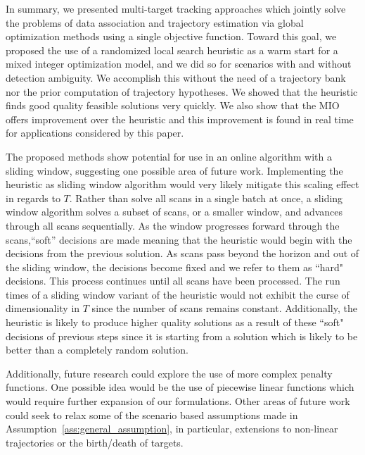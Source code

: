 In summary, we presented multi-target tracking approaches which jointly solve the problems of data association and trajectory estimation via global optimization methods using a single objective function. Toward this goal, we proposed the use of a randomized local search heuristic as a warm start for a mixed integer optimization model, and we did so for scenarios with and without detection ambiguity. We accomplish this without the need of a trajectory bank nor the prior computation of trajectory hypotheses. We showed that the heuristic finds good quality feasible solutions very quickly. We also show that the MIO offers improvement over the heuristic and this improvement is found in real time for applications considered by this paper.  

The proposed methods show potential for use in an online algorithm with a sliding window, suggesting one possible area of future work. Implementing the heuristic as sliding window algorithm would very likely mitigate this scaling effect in regards to $T$. Rather than solve all scans in a single batch at once, a sliding window algorithm solves a subset of scans, or a smaller window, and advances through all scans sequentially.  As the window progresses forward through the scans,``soft'' decisions are made meaning that the heuristic would begin with the decisions from the previous solution. As scans pass beyond the horizon and out of the sliding window, the decisions become fixed and we refer to them as ``hard" decisions. This process continues until all scans have been processed. The run times of a sliding window variant of the heuristic would not exhibit the curse of dimensionality in $T$ since the number of scans remains constant. Additionally, the heuristic is likely to produce higher quality solutions as a result of these ``soft" decisions of previous steps since it is starting from a solution which is likely to be better than a completely random solution. 

Additionally, future research could explore the use of more complex penalty functions. One possible idea would be the use of piecewise linear functions which would require further expansion of our formulations. Other areas of future work could seek to relax some of the scenario based assumptions made in Assumption~\ref{ass:general_assumption}, in particular, extensions to non-linear trajectories or the birth/death of targets. 
